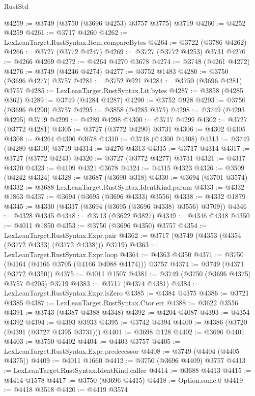 \begin{lexlean}{RustStd}
\begin{coremodule}
@4259 := @3749 (@3750 (@3696 @4253) @3757 @3775) @3719
@4260 := @4252 @4259
@4261 := @3717 @4260
@4262 := LexLeanTarget.RustSyntax.Item.compareBytes
@4264 := @3722 (@3786 @4262)
@4266 := @3727 (@3772 @4247)
@4269 := @3727 (@3772 @4253) @3731
@4270 := @4266 @4269
@4272 := @4264 @4270 @3678
@4274 := @3748 (@4261 @4272)
@4276 := @3749 (@4246 @4274)
@4277 := @3752 @1483
@4280 := @3750 (@3696 @4277) @3757
@4281 := @3752 @921
@4284 := @3750 (@3696 @4281) @3757
@4285 := LexLeanTarget.RustSyntax.Lit.bytes
@4287 := @3858 (@4285 @362)
@4289 := @3749 (@4284 @4287)
@4290 := @3752 @928
@4293 := @3750 (@3696 @4290) @3757
@4295 := @3858 (@4285 @375)
@4298 := @3749 (@4293 @4295) @3719
@4299 := @4289 @4298
@4300 := @3717 @4299
@4302 := @3727 (@3772 @4281)
@4305 := @3727 (@3772 @4290) @3731
@4306 := @4302 @4305
@4308 := @4264 @4306 @3678
@4310 := @3748 (@4300 @4308)
@4313 := @3749 (@4280 @4310) @3719
@4314 := @4276 @4313
@4315 := @3717 @4314
@4317 := @3727 (@3772 @4243)
@4320 := @3727 (@3772 @4277) @3731
@4321 := @4317 @4320
@4323 := @4109 @4321 @3678
@4324 := @4315 @4323
@4326 := @3509 (@4242 @4324)
@4328 := @3687 (@3690 @318)
@4330 := @3694 (@3701 @3574)
@4332 := @3688 LexLeanTarget.RustSyntax.IdentKind.param
@4333 := @4332 @1863
@4337 := @3694 (@3695 (@3696 @4333) @3556)
@4338 := @4332 @1879
@4345 := @4330 (@4337 (@3694 (@3695 (@3696 @4338) @3556) @3709))
@4346 := @4328 @4345
@4348 := @3713 (@3622 @3827)
@4349 := @4346 @4348
@4350 := @4011 @1850
@4353 := @3750 (@3696 @4350) @3757
@4354 := LexLeanTarget.RustSyntax.Expr.pair
@4362 := @3717 (@3749 (@4353 (@4354 (@3772 @4333) (@3772 @4338))) @3719)
@4363 := LexLeanTarget.RustSyntax.Expr.loop
@4364 := @4363 @4350
@4371 := @3750 (@4164 (@4166 @3705 (@4166 @4088 @4174))) @3757
@4374 := @3749 (@4371 (@3772 @4350))
@4375 := @4011 @1507
@4381 := @3749 (@3750 (@3696 @4375) @3757 @4205) @3719
@4383 := @3717 (@4374 @4381)
@4384 := LexLeanTarget.RustSyntax.Expr.isZero
@4385 := @4384 @4375
@4386 := @3721 @4385
@4387 := LexLeanTarget.RustSyntax.Ctor.err
@4388 := @3622 @3556
@4391 := @3743 (@4387 @4388 @4348)
@4392 := @4204 @4087
@4393 := @4354 @4392
@4394 := @4393 @3933
@4395 := @3742 @4394
@4400 := @4386 (@3720 (@4391 (@3727 @4395 @3731)))
@4401 := @3698 @128
@4402 := @3696 @4401
@4403 := @3750 @4402
@4404 := @4403 @3757
@4405 := LexLeanTarget.RustSyntax.Expr.predecessor
@4408 := @3749 (@4404 (@4405 @4375))
@4409 := @4011 @1660
@4412 := @3750 (@3696 @4409) @3757
@4413 := LexLeanTarget.RustSyntax.IdentKind.callee
@4414 := @3688 @4413
@4415 := @4414 @1578
@4417 := @3750 (@3696 @4415)
@4418 := Option.some.{0}
@4419 := @4418 @3518
@4420 := @4419 @3574

\end{coremodule}
\end{lexlean}
